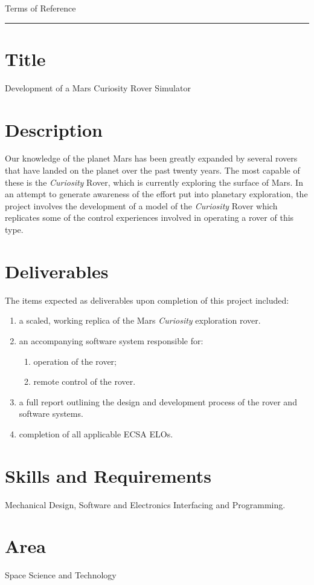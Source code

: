 {\Large Terms of Reference}\\
\hrule

\section*{Title}
  Development of a Mars Curiosity Rover Simulator
\section*{Description}
  Our knowledge of the planet Mars has been greatly expanded by several rovers that have landed on the planet over the past twenty years. The most capable of these is the \textit{Curiosity} Rover, which is currently exploring the surface of Mars. In an attempt to generate awareness of the effort put into planetary exploration, the project involves the development of a model of the \textit{Curiosity} Rover which replicates some of the control experiences involved in operating a rover of this type.
  
\section*{Deliverables}
  The items expected as deliverables upon completion of this project included:
  \begin{enumerate}
    \item a scaled, working replica of the Mars \textit{Curiosity} exploration rover.
    \item an accompanying software system responsible for:
      \begin{enumerate}
        \item operation of the rover;
        \item remote control of the rover.
      \end{enumerate}
    \item a full report outlining the design and development process of the rover and software systems.
    \item completion of all applicable ECSA ELOs.
  \end{enumerate}
  
\section*{Skills and Requirements}
  Mechanical Design, Software and Electronics Interfacing and Programming.
  
\section*{Area}
  Space Science and Technology
